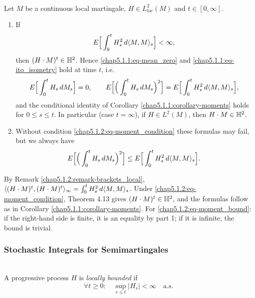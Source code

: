\begin{proposition}\label{chap5.1.2:proposition-moments_local}
\\
Let $M$ be a continuous local martingale, $H\in L^2_{loc}(M)$ and $t\in[0,\infty]$.
\begin{enumerate}
    \item If
    \begin{equation}\label{chap5.1.2:eq-moment_condition}
        E\Big[\int_0^t H_s^2\,d\langle M,M\rangle_s\Big]<\infty,
    \end{equation}
    then $(H\cdot M)^t\in\mathbb{H}^2$. Hence \eqref{chap5.1.1:eq-mean_zero} and \eqref{chap5.1.1:eq-ito_isometry} hold at time $t$, i.e.
    $$E\Big[\int_0^t H_s\,dM_s\Big]=0,\qquad E\Big[\Big(\int_0^t H_s\,dM_s\Big)^2\Big]=E\Big[\int_0^t H_s^2\,d\langle M,M\rangle_s\Big],$$
    and the conditional identity of Corollary \ref{chap5.1.1:corollary-moments} holds for $0\leq s\leq t$. In particular (case $t=\infty$), if $H\in L^2(M)$, then $H\cdot M\in\mathbb{H}^2$.
    \item Without condition \eqref{chap5.1.2:eq-moment_condition} these formulas may fail, but we always have
    \begin{equation}\label{chap5.1.2:eq-moment_bound}
        E\Big[\Big(\int_0^t H_s\,dM_s\Big)^2\Big]\leq E\Big[\int_0^t H_s^2\,d\langle M,M\rangle_s\Big].
    \end{equation}
\end{enumerate}
\end{proposition}

\begin{proofidea}
By Remark \ref{chap5.1.2:remark-brackets_local}, $\langle (H\cdot M)^t,(H\cdot M)^t\rangle_\infty=\int_0^t H_s^2\,d\langle M,M\rangle_s$. Under \eqref{chap5.1.2:eq-moment_condition}, Theorem 4.13 gives $(H\cdot M)^t\in\mathbb{H}^2$, and the formulas follow as in Corollary \ref{chap5.1.1:corollary-moments}. For \eqref{chap5.1.2:eq-moment_bound}: if the right-hand side is finite, it is an equality by part 1; if it is infinite, the bound is trivial.
\end{proofidea}

\subsubsection{Stochastic Integrals for Semimartingales}

\begin{definition}\label{chap5.1.3:definition-locally_bounded}
\\
A progressive process $H$ is \textit{locally bounded} if
$$\forall t\geq 0:\quad \sup_{s\leq t}|H_s|<\infty \quad\text{a.s.}$$
\end{definition}

